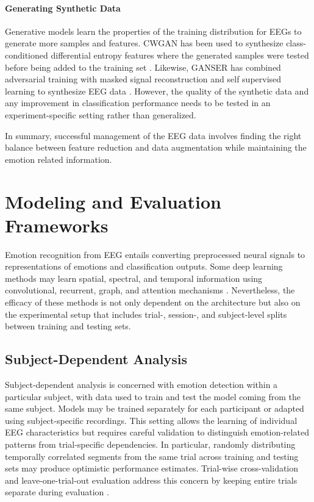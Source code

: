 \documentclass[ASNA,twocolumn]{USG}
\begin{document}
\paragraph{Generating Synthetic Data}

Generative models learn the properties of the training distribution for EEGs to generate more samples and features. CWGAN has been used to synthesize class-conditioned differential entropy features where the generated samples were tested before being added to the training set \cite{luo2018_cwgan}. Likewise, GANSER has combined adversarial training with masked signal reconstruction and self supervised learning to synthesize EEG data \cite{zhang2022ganser}. However, the quality of the synthetic data and any improvement in classification performance needs to be tested in an experiment-specific setting rather than generalized.

In summary, successful management of the EEG data involves finding the right balance between feature reduction and data augmentation while maintaining the emotion related information.

\section{Modeling and Evaluation Frameworks}
Emotion recognition from EEG entails converting preprocessed neural signals to representations of emotions and classification outputs. Some deep learning methods may learn spatial, spectral, and temporal information using convolutional, recurrent, graph, and attention mechanisms \cite{ding2022tsception,zhu2024eeg}. Nevertheless, the efficacy of these methods is not only dependent on the architecture but also on the experimental setup that includes trial-, session-, and subject-level splits between training and testing sets.

\subsection{Subject-Dependent Analysis}
\label{sec:subject_dependent_analysis}

Subject-dependent analysis is concerned with emotion detection within a particular subject, with data used to train and test the model coming from the same subject. Models may be trained separately for each participant or adapted using subject-specific recordings. This setting allows the learning of individual EEG characteristics but requires careful validation to distinguish emotion-related patterns from trial-specific dependencies. In particular, randomly distributing temporally correlated segments from the same trial across training and testing sets may produce optimistic performance estimates. Trial-wise cross-validation and leave-one-trial-out evaluation address this concern by keeping entire trials separate during evaluation \cite{ding2022tsception}.
\end{document}
